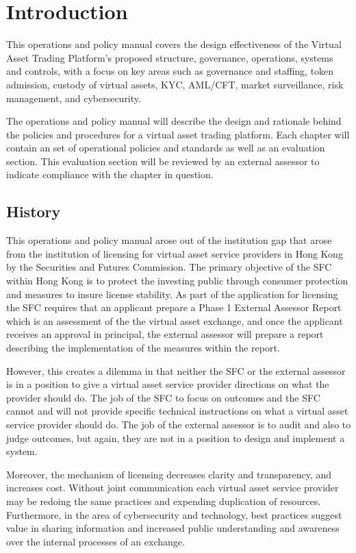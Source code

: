 \chapter{Introduction}

This operations and policy manual covers the design effectiveness of
the Virtual Asset Trading Platform's proposed structure, governance,
operations, systems and controls, with a focus on key areas such as
governance and staffing, token admission, custody of virtual assets,
KYC, AML/CFT, market surveillance, risk management, and cybersecurity.

The operations and policy manual will describe the design and
rationale behind the policies and procedures for a virtual asset
trading platform.  Each chapter will contain an set of operational
policies and standards as well as an evaluation section.  This
evaluation section will be reviewed by an external assessor to
indicate compliance with the chapter in question.

\section{History}

This operations and policy manual arose out of the institution gap
that arose from the institution of licensing for virtual asset service
providers in Hong Kong by the Securities and Futures Commission.  The
primary objective of the SFC within Hong Kong is to protect the
investing public through consumer protection and measures to insure
license stability.  As part of the application for licensing the SFC
requires that an applicant prepare a Phase 1 External Assessor Report
which is an assessment of the the virtual asset exchange, and once the
applicant receives an approval in principal, the external assessor
will prepare a report describing the implementation of the measures
within the report.

However, this creates a dilemma in that neither the SFC or the
external assessor is in a position to give a virtual asset service
provider directions on what the provider should do.  The job of the
SFC to focus on outcomes and the SFC cannot and will not provide
specific technical instructions on what a virtual asset service
provider should do.  The job of the external assessor is to audit and
also to judge outcomes, but again, they are not in a position to
design and implement a system.

Moreover, the mechanism of licensing decreases clarity and
transparency, and increases cost.  Without joint communication each
virtual asset service provider may be redoing the same practices and
expending duplication of resources.  Furthermore, in the area of
cybersecurity and technology, best practices suggest value in sharing
information and increased public understanding and awareness over the
internal processes of an exchange.


